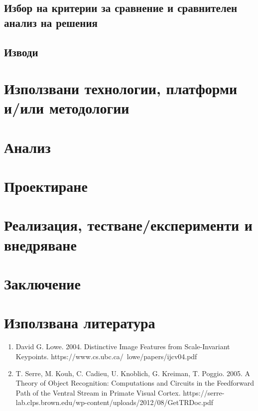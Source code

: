 \documentclass[a4paper,12pt]{article}
\begin{document}
\subsection{Избор на критерии за сравнение и сравнителен анализ на решения}
\subsection{Изводи}

\section{Използвани технологии, платформи и/или методологии}

\section{Анализ}

\section{Проектиране}

\section{Реализация, тестване/експерименти и внедряване}

\section{Заключение}

\section{Използвана литература}

\begin{enumerate}
    \item David G. Lowe. 2004. Distinctive Image Features from Scale-Invariant Keypoints. https://www.cs.ubc.ca/~lowe/papers/ijcv04.pdf
    \item T. Serre, M. Kouh, C. Cadieu, U. Knoblich, G. Kreiman, T. Poggio. 2005. A Theory of Object Recognition: Computations and Circuits in the Feedforward Path of the Ventral Stream in Primate Visual Cortex. https://serre-lab.clps.brown.edu/wp-content/uploads/2012/08/GetTRDoc.pdf
\end{enumerate}
\end{document}
